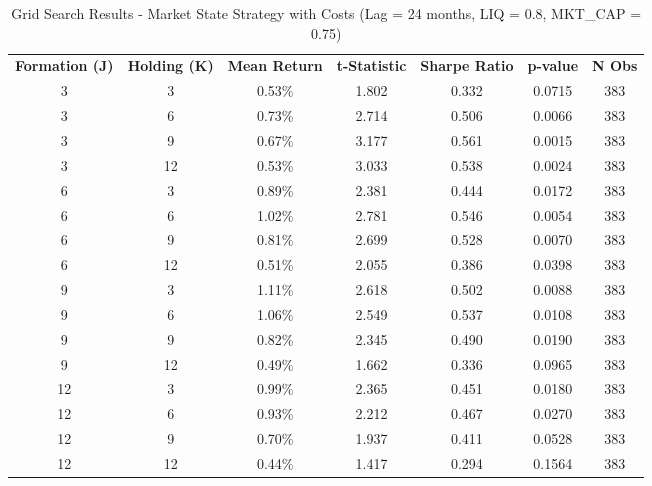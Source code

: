 \begin{table}[htbp]
\caption{Grid Search Results - Market State Strategy with Costs (Lag = 24 months, LIQ = 0.8, MKT\_CAP = 0.75)}
\label{tab:grid_search_costs_lag24}
\begin{tabular}{cc|ccccc}
\hline
\textbf{Formation (J)} & \textbf{Holding (K)} & \textbf{Mean Return} & \textbf{t-Statistic} & \textbf{Sharpe Ratio} & \textbf{p-value} & \textbf{N Obs} \\
\cline{3-7}
3 & 3 & 0.53\% & 1.802 & 0.332 & 0.0715 & 383 \\
3 & 6 & 0.73\% & 2.714 & 0.506 & 0.0066 & 383 \\
3 & 9 & 0.67\% & 3.177 & 0.561 & 0.0015 & 383 \\
3 & 12 & 0.53\% & 3.033 & 0.538 & 0.0024 & 383 \\
6 & 3 & 0.89\% & 2.381 & 0.444 & 0.0172 & 383 \\
6 & 6 & 1.02\% & 2.781 & 0.546 & 0.0054 & 383 \\
6 & 9 & 0.81\% & 2.699 & 0.528 & 0.0070 & 383 \\
6 & 12 & 0.51\% & 2.055 & 0.386 & 0.0398 & 383 \\
9 & 3 & 1.11\% & 2.618 & 0.502 & 0.0088 & 383 \\
9 & 6 & 1.06\% & 2.549 & 0.537 & 0.0108 & 383 \\
9 & 9 & 0.82\% & 2.345 & 0.490 & 0.0190 & 383 \\
9 & 12 & 0.49\% & 1.662 & 0.336 & 0.0965 & 383 \\
12 & 3 & 0.99\% & 2.365 & 0.451 & 0.0180 & 383 \\
12 & 6 & 0.93\% & 2.212 & 0.467 & 0.0270 & 383 \\
12 & 9 & 0.70\% & 1.937 & 0.411 & 0.0528 & 383 \\
12 & 12 & 0.44\% & 1.417 & 0.294 & 0.1564 & 383 \\
\hline
\end{tabular}
\end{table}
